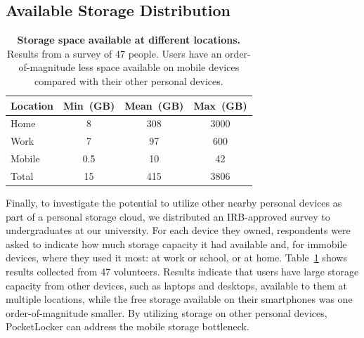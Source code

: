 \subsection{Available Storage Distribution}

\begin{table}[t]
{\small
\begin{tabularx}{\columnwidth}{Xccc}

\textbf{Location} & \textbf{Min~(GB)} & \textbf{Mean~(GB)} &
\textbf{Max~(GB)} \\ \toprule
Home & 8 & 308 & 3000 \\
Work & 7 & 97 & 600 \\
Mobile & 0.5 & 10 & 42 \\
Total & 15 & 415 & 3806 \\

\end{tabularx}
}
\caption{\small \textbf{Storage space available at different locations.}
Results from a survey of 47 people. Users have an order-of-magnitude less
space available on mobile devices compared with their other personal
devices.}

\label{table-storagesurvey}
\vspace*{-0.2in}
\end{table}

Finally, to investigate the potential to utilize other nearby personal
devices as part of a personal storage cloud, we distributed an IRB-approved
survey to undergraduates at our university. For each device they owned,
respondents were asked to indicate how much storage capacity it had available
and, for immobile devices, where they used it most: at work or school, or at
home. Table~\ref{table-storagesurvey} shows results collected from 47
volunteers. Results indicate that users have large storage capacity from
other devices, such as laptops and desktops, available to them at multiple
locations, while the free storage available on their smartphones was one
order-of-magnitude smaller. By utilizing storage on other personal devices,
PocketLocker can address the mobile storage bottleneck.

